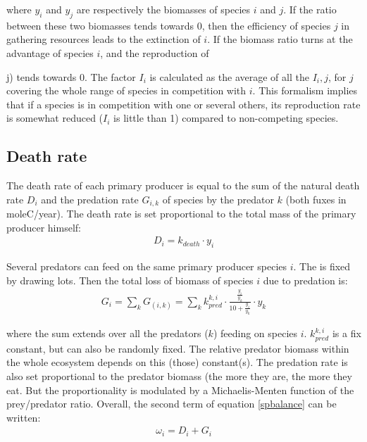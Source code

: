 \documentclass[11pt, oneside]{article}   	%
\begin{document}
where $y_i$ and $y_j$ are respectively the biomasses of species $i$ and $j$. If the ratio between these two biomasses tends towards 0, then the efficiency of species $j$ in gathering resources leads to the extinction of $i$. If the biomass ratio turns at the advantage of species $i$, and the reproduction of {j) tends towards 0. The factor $I_i$ is calculated as the average of all the $I_i,j$, for $j$ covering the whole range of species in competition with $i$. This formalism implies that if a species is in competition with one or several others, its reproduction rate is somewhat reduced ($I_i$ is little than 1) compared to non-competing species.

\subsection{Death rate}
The death rate of each primary producer is equal to the sum of the natural death rate $D_i$ and the predation rate $G_{i,k}$  of species by the predator $k$ (both fuxes in moleC/year). The death rate is set proportional to the total mass of the primary producer himself:
\\
\begin{eqnarray}
D_i=k_{death} \cdot y_i
\label{death_rate}
\end{eqnarray}

Several predators can feed on the same primary producer species $i$. The is fixed by drawing lots. Then the total loss of biomass of species $i$ due to predation is:
\\
\begin{eqnarray}
G_i=\sum_k {G_(i,k)}=\sum_k {k_{pred}^{k,i} \cdot \frac{\frac{y_i}{y_k}}{10+\frac{y_i}{y_k}} \cdot y_k}
\label{predation_rate}
\end{eqnarray}

where the sum extends over all the predators ($k$) feeding on species $i$. $k_{pred}^{k,i}$ is a fix constant, but can also be randomly fixed. The relative predator biomass within the whole ecosystem depends on this (those) constant(s). The predation rate is also set proportional to the predator biomass (the more they are, the more they eat. But the proportionality is modulated by a Michaelis-Menten function of the prey/predator ratio. Overall, the second term of equation \ref{spbalance} can be written:
\\
\begin{eqnarray}
\omega_{i}=D_i + G_i
\label{destruction}
\end{eqnarray}



}
\end{document}
